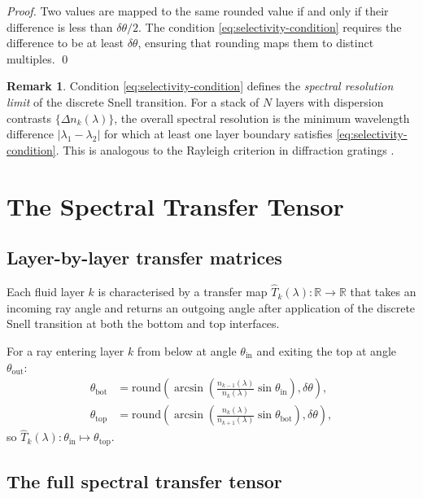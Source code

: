 \documentclass[11pt,twocolumn,a4paper]{article}
\theoremstyle{plain}
\theoremstyle{definition}
\newtheorem{remark}[theorem]{Remark}
\theoremstyle{remark}
\begin{document}
\begin{proof}
Two values are mapped to the same rounded value if and only if their difference is less than $\delta\theta/2$. The condition \eqref{eq:selectivity-condition} requires the difference to be at least $\delta\theta$, ensuring that rounding maps them to distinct multiples. \qed
\end{proof}

\begin{remark}
Condition \eqref{eq:selectivity-condition} defines the \emph{spectral resolution limit} of the discrete Snell transition. For a stack of $N$ layers with dispersion contrasts $\{\Delta n_k(\lambda)\}$, the overall spectral resolution is the minimum wavelength difference $|\lambda_1-\lambda_2|$ for which at least one layer boundary satisfies \eqref{eq:selectivity-condition}. This is analogous to the Rayleigh criterion in diffraction gratings \cite{BornWolf1999}.
\end{remark}

\section{The Spectral Transfer Tensor}
\label{sec:transfer-tensor}

\subsection{Layer-by-layer transfer matrices}

Each fluid layer $k$ is characterised by a transfer map $\hat{T}_k(\lambda):\mathbb{R}\to\mathbb{R}$ that takes an incoming ray angle and returns an outgoing angle after application of the discrete Snell transition at both the bottom and top interfaces.

For a ray entering layer $k$ from below at angle $\theta_\text{in}$ and exiting the top at angle $\theta_\text{out}$:
\begin{align}
  \theta_\text{bot} &= \mathrm{round}\!\left(\arcsin\!\left(\frac{n_{k-1}(\lambda)}{n_k(\lambda)}\sin\theta_\text{in}\right),\delta\theta\right), \label{eq:bottom-refraction}\\
  \theta_\text{top} &= \mathrm{round}\!\left(\arcsin\!\left(\frac{n_k(\lambda)}{n_{k+1}(\lambda)}\sin\theta_\text{bot}\right),\delta\theta\right), \label{eq:top-refraction}
\end{align}
so $\hat{T}_k(\lambda):\theta_\text{in}\mapsto\theta_\text{top}$.

\subsection{The full spectral transfer tensor}
\end{document}
